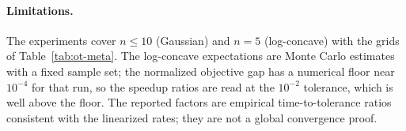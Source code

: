 \documentclass[11pt]{article}
\begin{document}
\paragraph{Limitations.}
The experiments cover $n\le 10$ (Gaussian) and $n=5$ (log-concave) with the
grids of Table~\ref{tab:ot-meta}. The log-concave expectations are Monte Carlo
estimates with a fixed sample set; the normalized objective gap has a numerical
floor near $10^{-4}$ for that run, so the speedup ratios are read at the
$10^{-2}$ tolerance, which is well above the floor. The reported factors are
empirical time-to-tolerance ratios consistent with the linearized rates; they
are not a global convergence proof.
\end{document}
